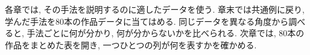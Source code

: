     各章では, その手法を説明するのに適したデータを使う. 章末では共通例に戻り, 学んだ手法を80本の作品データに当てはめる. 同じデータを異なる角度から調べると, 手法ごとに何が分かり, 何が分からないかを比べられる.
    次章では, 80本の作品をまとめた表を開き, 一つひとつの列が何を表すかを確かめる.






